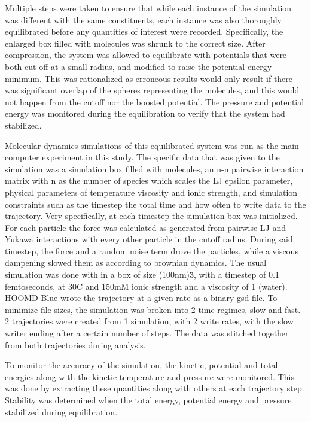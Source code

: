 \documentclass[a4paper,11pt,oneside]{book}
\begin{document}
Multiple steps were taken to ensure that while each instance of the simulation was different with the same constituents, each instance was also thoroughly equilibrated before any quantities of interest were recorded. Specifically, the enlarged box filled with molecules was shrunk to the correct size. After compression, the system was allowed to equilibrate with potentials that were both cut off at a small radius, and modified to raise the potential energy minimum. This was rationalized as erroneous results would only result if there was significant overlap of the spheres representing the molecules, and this would not happen from the cutoff nor the boosted potential. The pressure and potential energy was monitored during the equilibration to verify that the system had stabilized.

Molecular dynamics simulations of this equilibrated system was run as the main computer experiment in this study. The specific data that was given to the simulation was a simulation box filled with molecules, an n-n pairwise interaction matrix with n as the number of species which scales the LJ epsilon parameter, physical parameters of temperature viscosity and ionic strength, and simulation constraints such as the timestep the total time and how often to write data to the trajectory. Very specifically, at each timestep the simulation box was initialized. For each particle the force was calculated as generated from pairwise LJ and Yukawa interactions with every other particle in the cutoff radius. During said timestep, the force and a random noise term drove the particles, while a viscous dampening slowed them as according to brownian dynamics. The usual simulation was done with in a box of size (100nm)\^3, with a timestep of 0.1 femtoseconds, at 30C and 150mM ionic strength and a viscosity of 1 (water). HOOMD-Blue wrote the trajectory at a given rate as a binary gsd file. To minimize file sizes, the simulation was broken into 2 time regimes, slow and fast. 2 trajectories were created from 1 simulation, with 2 write rates, with the slow writer ending after a certain number of steps. The data was stitched together from both trajectories during analysis.

To monitor the accuracy of the simulation, the kinetic, potential and total energies along with the kinetic temperature and pressure were monitored. This was done by extracting these quantities along with others at each trajectory step. Stability was determined when the total energy, potential energy and pressure stabilized during equilibration.
\end{document}
